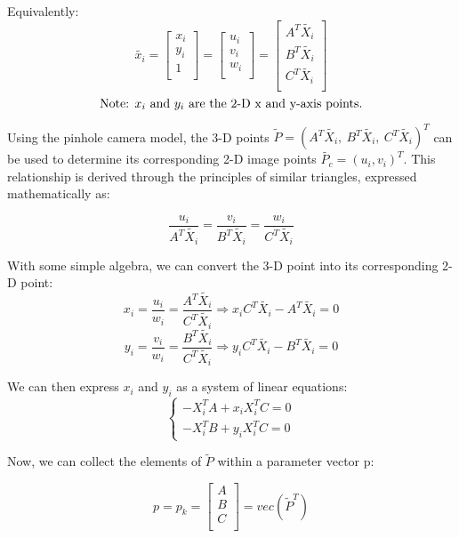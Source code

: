 \documentclass[12pt]{article}
\begin{document}
\noindent Equivalently:
\[
\tilde{x_i} = 
\begin{bmatrix}
x_i \\
y_i \\
1 \\
\end{bmatrix} = 
\begin{bmatrix}
u_i \\
v_i \\
w_i \\
\end{bmatrix} = 
\begin{bmatrix}
A^T \tilde{X_i} \\
B^T \tilde{X_i} \\
C^T \tilde{X_i} \\
\end{bmatrix}
\]
\[
\text{Note: \( x_i \) and \( y_i \) are the 2-D x and y-axis points.}
\]

\noindent Using the pinhole camera model, the 3-D points \( \tilde{P} = (A^T \tilde{X_i},\ B^T \tilde{X_i},\ C^T \tilde{X_i})^T \) can be used to determine its corresponding 2-D image points \( \tilde{P_c} = (u_i, v_i)^T \). This relationship is derived through the principles of similar triangles, expressed mathematically as:

\[
\frac{u_i}{A^T \tilde{X_i}} = \frac{v_i}{B^T \tilde{X_i}} = \frac{w_i}{C^T \tilde{X_i}}
\]

\noindent With some simple algebra, we can convert the 3-D point into its corresponding 2-D point: \\
\[
x_i = \frac{u_i}{w_i} = \frac{A^T \tilde{X_i}}{C^T \tilde{X_i}} \Longrightarrow x_i C^T \tilde{X_i} - A^T \tilde{X_i} = 0
\]
\[
y_i = \frac{v_i}{w_i} = \frac{B^T \tilde{X_i}}{C^T \tilde{X_i}} \Longrightarrow y_i C^T \tilde{X_i} - B^T \tilde{X_i} = 0
\]

\noindent We can then express \( x_i \) and \( y_i \) as a system of linear equations:
\[
\left\{
    \begin{array}{l}
        -X_{i}^{T}A + x_{i}X_{i}^{T}C = 0 \\
        -X_{i}^{T}B + y_{i}X_{i}^{T}C = 0
    \end{array}
\right.
\]

\noindent Now, we can collect the elements of \( \tilde{P} \) within a parameter vector p:

\[
p = p_k = 
\begin{bmatrix}
A \\
B \\
C \\
\end{bmatrix} = 
vec(\tilde{P}^T)
\]
\end{document}
